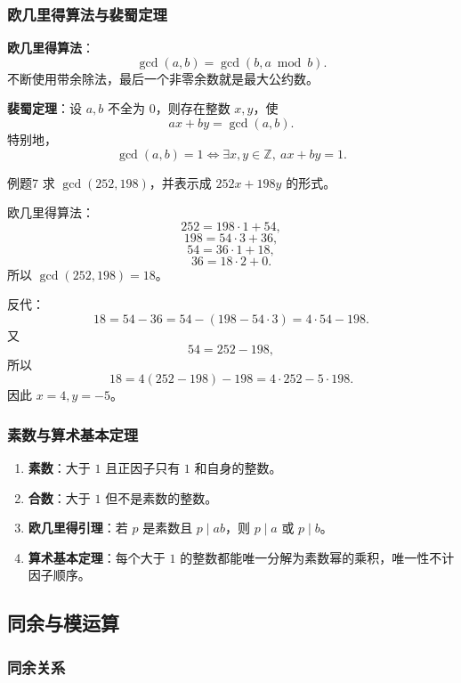 \subsubsection{欧几里得算法与裴蜀定理}

\textbf{欧几里得算法}：
\[
\gcd(a,b)=\gcd(b,a\bmod b).
\]
不断使用带余除法，最后一个非零余数就是最大公约数。

\textbf{裴蜀定理}：设 \(a,b\) 不全为 \(0\)，则存在整数 \(x,y\)，使
\[
ax+by=\gcd(a,b).
\]
特别地，
\[
\gcd(a,b)=1\Leftrightarrow \exists x,y\in\mathbb Z,\ ax+by=1.
\]

\begin{question}{例题7}
	求 \(\gcd(252,198)\)，并表示成 \(252x+198y\) 的形式。
	
	\begin{solution}
	欧几里得算法：
	\[
	252=198\cdot1+54,
	\]
	\[
	198=54\cdot3+36,
	\]
	\[
	54=36\cdot1+18,
	\]
	\[
	36=18\cdot2+0.
	\]
	所以 \(\gcd(252,198)=18\)。
	
	反代：
	\[
	18=54-36=54-(198-54\cdot3)=4\cdot54-198.
	\]
	又
	\[
	54=252-198,
	\]
	所以
	\[
	18=4(252-198)-198=4\cdot252-5\cdot198.
	\]
	因此 \(x=4,y=-5\)。
	\end{solution}
\end{question}

\subsubsection{素数与算术基本定理}

\begin{enumerate}
	\item \textbf{素数}：大于 \(1\) 且正因子只有 \(1\) 和自身的整数。
	\item \textbf{合数}：大于 \(1\) 但不是素数的整数。
	\item \textbf{欧几里得引理}：若 \(p\) 是素数且 \(p\mid ab\)，则 \(p\mid a\) 或 \(p\mid b\)。
	\item \textbf{算术基本定理}：每个大于 \(1\) 的整数都能唯一分解为素数幂的乘积，唯一性不计因子顺序。
\end{enumerate}

\subsection{同余与模运算}

\subsubsection{同余关系}

